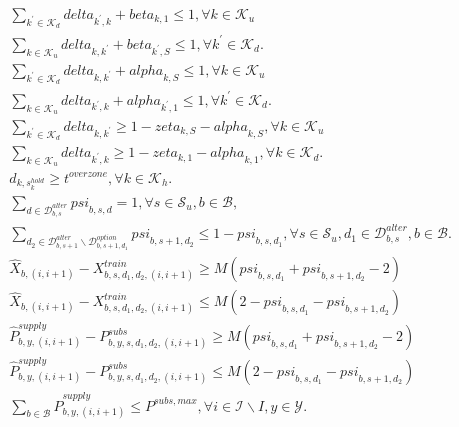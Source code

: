 \begin{align}
  & \sum_{k^{'} \in \mathcal{K}_{d}} \mathit{delta}_{k^{'} , k} + \mathit{beta}_{k , 1} \leq 1 , \forall k \in \mathcal{K}_{u} \tag{eq\_0047\_a} \\
  & \sum_{k \in \mathcal{K}_{u}} \mathit{delta}_{k , k^{'}} + \mathit{beta}_{k^{'} , S} \leq 1 , \forall k^{'} \in \mathcal{K}_{d} . \tag{eq\_0047\_b} \\
  & \sum_{k^{'} \in \mathcal{K}_{d}} \mathit{delta}_{k , k^{'}} + \mathit{alpha}_{k , S} \leq 1 , \forall k \in \mathcal{K}_{u} \tag{eq\_0048\_a} \\
  & \sum_{k \in \mathcal{K}_{u}} \mathit{delta}_{k^{'} , k} + \mathit{alpha}_{k^{'} , 1} \leq 1 , \forall k^{'} \in \mathcal{K}_{d} . \tag{eq\_0048\_b} \\
  & \sum_{k^{'} \in \mathcal{K}_{d}} \mathit{delta}_{k , k^{'}} \geq 1 - \mathit{zeta}_{k , S} - \mathit{alpha}_{k , S} , \forall k \in \mathcal{K}_{u} \tag{eq\_0049\_a} \\
  & \sum_{k \in \mathcal{K}_{u}} \mathit{delta}_{k^{'} , k} \geq 1 - \mathit{zeta}_{k , 1} - \mathit{alpha}_{k , 1} , \forall k \in \mathcal{K}_{d} . \tag{eq\_0049\_b} \\
  & d_{k , s_{k}^{hold}} \geq t^{overzone} , \forall k \in \mathcal{K}_{h} . \tag{eq\_0050} \\
  & \sum_{d \in \mathcal{D}_{b , s}^{alter}} \mathit{psi}_{b , s , d} = 1 , \forall s \in \mathcal{S}_{u} , b \in \mathcal{B} , \tag{eq\_0052} \\
  & \underset{d_{2} \in \mathcal{D}_{b , s + 1}^{alter} \backslash \mathcal{D}_{b , s + 1 , d_{1}}^{option}}{\sum} \mathit{psi}_{b , s + 1 , d_{2}} \leq 1 - \mathit{psi}_{b , s , d_{1}} , \forall s \in \mathcal{S}_{u} , d_{1} \in \mathcal{D}_{b , s}^{alter} , b \in \mathcal{B} . \tag{eq\_0053} \\
  & \hat{X}_{b , \left(i , i + 1\right)} - X_{b , s , d_{1} , d_{2} , \left(i , i + 1\right)}^{train} \geq M \left(\mathit{psi}_{b , s , d_{1}} + \mathit{psi}_{b , s + 1 , d_{2}} - 2\right) \tag{eq\_0054\_a} \\
  & \hat{X}_{b , \left(i , i + 1\right)} - X_{b , s , d_{1} , d_{2} , \left(i , i + 1\right)}^{train} \leq M \left(2 - \mathit{psi}_{b , s , d_{1}} - \mathit{psi}_{b , s + 1 , d_{2}}\right) \tag{eq\_0054\_b} \\
  & \hat{P}_{b , y , \left(i , i + 1\right)}^{supply} - P_{b , y , s , d_{1} , d_{2} , \left(i , i + 1\right)}^{subs} \geq M \left(\mathit{psi}_{b , s , d_{1}} + \mathit{psi}_{b , s + 1 , d_{2}} - 2\right) \tag{eq\_0057\_a} \\
  & \hat{P}_{b , y , \left(i , i + 1\right)}^{supply} - P_{b , y , s , d_{1} , d_{2} , \left(i , i + 1\right)}^{subs} \leq M \left(2 - \mathit{psi}_{b , s , d_{1}} - \mathit{psi}_{b , s + 1 , d_{2}}\right) \tag{eq\_0057\_b} \\
  & \sum_{b \in \mathcal{B}} \hat{P}_{b , y , \left(i , i + 1\right)}^{supply} \leq P^{subs,max} , \forall i \in \mathcal{I} \backslash I , y \in \mathcal{Y} . \tag{eq\_0060} \\
\end{align}

